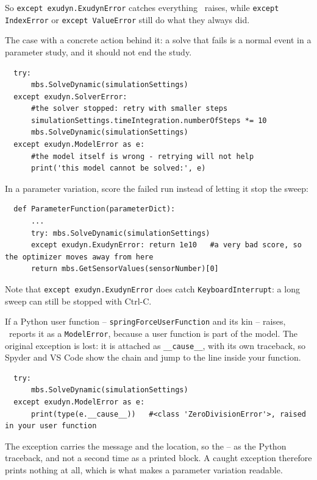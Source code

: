 \noindent So \texttt{except exudyn.ExudynError} catches everything \codeName\ raises, while
\texttt{except IndexError} or \texttt{except ValueError} still do what they always did.

%
The case with a concrete action behind it: a solve that fails is a normal event in a parameter
study, and it should not end the study.
\pythonstyle\begin{lstlisting}
  try:
      mbs.SolveDynamic(simulationSettings)
  except exudyn.SolverError:
      #the solver stopped: retry with smaller steps
      simulationSettings.timeIntegration.numberOfSteps *= 10
      mbs.SolveDynamic(simulationSettings)
  except exudyn.ModelError as e:
      #the model itself is wrong - retrying will not help
      print('this model cannot be solved:', e)
\end{lstlisting}

\noindent In a parameter variation, score the failed run instead of letting it stop the sweep:
\pythonstyle\begin{lstlisting}
  def ParameterFunction(parameterDict):
      ...
      try: mbs.SolveDynamic(simulationSettings)
      except exudyn.ExudynError: return 1e10   #a very bad score, so the optimizer moves away from here
      return mbs.GetSensorValues(sensorNumber)[0]
\end{lstlisting}

\noindent Note that \texttt{except exudyn.ExudynError} does  catch
\texttt{KeyboardInterrupt}: a long sweep can still be stopped with Ctrl-C.

%
If a Python user function -- \texttt{springForceUserFunction} and its kin -- raises, \codeName\
reports it as a \texttt{ModelError}, because a user function is part of the model. The original
exception is \mybold{not} lost: it is attached as \texttt{\_\_cause\_\_}, with its own traceback,
so Spyder and VS Code show the chain and jump to the line inside your function.
\pythonstyle\begin{lstlisting}
  try:
      mbs.SolveDynamic(simulationSettings)
  except exudyn.ModelError as e:
      print(type(e.__cause__))   #<class 'ZeroDivisionError'>, raised in your user function
\end{lstlisting}

%
The exception carries the message and the location, so the  -- as
the Python traceback, and not a second time as a printed block. A caught exception therefore
prints nothing at all, which is what makes a parameter variation readable.

